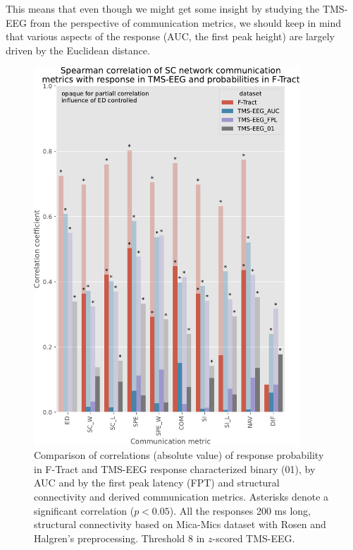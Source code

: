 This means that even though we might get some insight by studying the TMS-EEG from the perspective of communication metrics, we should keep in mind that various aspects of the response (AUC, the first peak height) are largely driven by the Euclidean distance. 

\begin{figure}
  \begin{center}
    \includegraphics[width=0.89\textwidth]{images/nootebook_generated/tmseeg_ftract_comparison_results/200ms/Spearman_correlation_of_SC_network_communication_metrics_with_response_in_TMS-EEG_and_probabilities_in_F-Tract.pdf}
  \end{center}
  \caption[Comparison of correlations for F-Tract and TMS-EEG]{Comparison of correlations (absolute value) of response probability in F-Tract and TMS-EEG response characterized binary (01), by AUC and by the first peak latency (FPT) and structural connectivity and derived communication metrics. Asterisks denote a significant correlation ($p<0.05$). All the responses 200 ms long, structural connectivity based on Mica-Mics dataset with Rosen and Halgren's preprocessing. Threshold 8 in $z$-scored TMS-EEG.}
  \label{fig:compare-correlations_F-Tract-TMS}
\end{figure}

